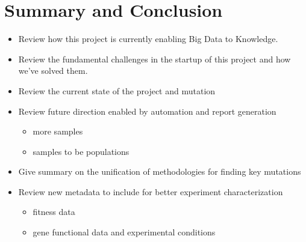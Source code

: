 \documentclass[12pt,final,masters,chapterheads]{ucsd}  %
\begin{document}
\chapter{Summary and Conclusion}
\begin{itemize}
\item Review how this project is currently enabling Big Data to Knowledge.
\item Review the fundamental challenges in the startup of this project and how we've solved them.
\item Review the current state of the project and mutation
\item Review future direction enabled by automation and report generation
\begin{itemize}
\item more samples
\item samples to be populations
\end{itemize}
\item Give summary on the unification of methodologies for finding key mutations
\item Review new metadata to include for better experiment characterization
\begin{itemize}
\item fitness data
\item gene functional data and experimental conditions
\end{itemize}
\end{itemize}

\appendix

\end{document}
